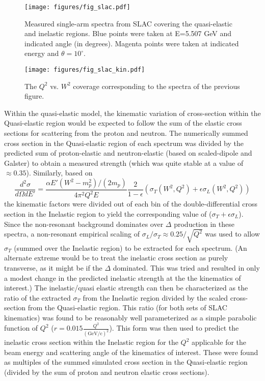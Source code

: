 \documentclass[12pt,letterpaper,oneside]{article}
\begin{document}
\begin{figure}
\texttt{[image: figures/fig\_slac.pdf]}
\caption{\label{SLAC_data}Measured single-arm spectra from SLAC
covering the quasi-elastic and inelastic regions.  Blue points were
taken at E=5.507 GeV and indicated angle (in degrees).  Magenta points were taken
at indicated energy and $\theta=10^\circ$.}
\end{figure}

\begin{figure}
\texttt{[image: figures/fig\_slac\_kin.pdf]}
\caption{\label{SLAC_kin}The $Q^2$ vs. $W^2$ coverage corresponding to
the spectra of the previous figure.
}
\end{figure}

Within the quasi-elastic model, the kinematic variation of
cross-section within the Quasi-elastic region would be expected to follow
the sum of the elastic cross sections for scattering from the proton 
and neutron.  The numerically summed cross section in the Quasi-elastic
region of each spectrum was divided by the predicted sum of
proton-elastic and neutron-elastic (based on scaled-dipole and
Galster) to obtain a measured strength (which was quite stable at a
value of $\approx 0.35$).  Similarly, based on
$$\frac{d^2\sigma}{d\Omega dE'}=\frac{\alpha E' (W^2-m_p^2)/(2m_p)}
{4\pi^2 Q^2E}\frac{2}{1-\epsilon}(\sigma_T(W^2,Q^2)+\epsilon\sigma_L(W^2,Q^2))$$
the kinematic factors were divided
out of each bin of the double-differential cross section in the Inelastic region to
yield the corresponding value of ($\sigma_T+\epsilon\sigma_L$).  Since 
the non-resonant background
dominates over $\Delta$ production in these spectra, a non-resonant
empirical scaling of $\sigma_L/\sigma_T\approx 0.25/\sqrt{Q^2}$ was used
to allow $\sigma_T$ (summed over the Inelastic region) to be
extracted for each spectrum.  (An alternate extreme would be to treat
the inelastic cross section as purely transverse, as it might be if
the $\Delta$ dominated.  This was tried and resulted in only a modest
change in the predicted inelastic strength at the the kinematics of
interest.)  The inelastic/quasi elastic strength can then be
characterized as the ratio of the extracted $\sigma_T$ from the
Inelastic region divided by the
scaled cross-section from the Quasi-elastic region.  This ratio (for
both sets of SLAC kinematics)  was
found to be reasonably well parameterized as a simple parabolic function of 
$Q^2$ ($r=0.015 \frac{Q^2}{(\mbox{GeV/c})^2}$).  This form was then used to predict the
inelastic cross section within the Inelastic region for the $Q^2$
applicable for the beam energy and scattering angle of the kinematics
of interest.  These were found as multiples of the summed simulated
cross section in the Quasi-elastic region (divided by the sum of
proton and neutron elastic cross sections).  
\end{document}
